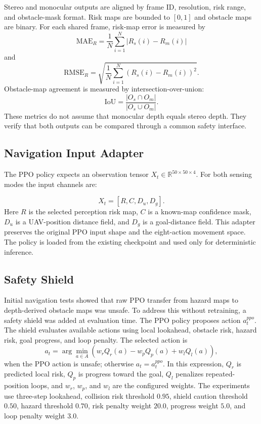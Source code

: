 \documentclass[12pt]{article}
\begin{document}
\noindent
Stereo and monocular outputs are aligned by frame ID, resolution, risk range, and obstacle-mask format. Risk maps are bounded to $[0,1]$ and obstacle maps are binary. For each shared frame, risk-map error is measured by
\begin{equation}
\text{MAE}_{R}=\frac{1}{N}\sum_{i=1}^{N}|R_s(i)-R_m(i)|
\end{equation}
and
\begin{equation}
\text{RMSE}_{R}=\sqrt{\frac{1}{N}\sum_{i=1}^{N}(R_s(i)-R_m(i))^2}.
\end{equation}
Obstacle-map agreement is measured by intersection-over-union:
\begin{equation}
\text{IoU}=\frac{|O_s \cap O_m|}{|O_s \cup O_m|}.
\end{equation}
These metrics do not assume that monocular depth equals stereo depth. They verify that both outputs can be compared through a common safety interface.

\subsection{Navigation Input Adapter}

\noindent
The PPO policy expects an observation tensor $X_t \in \mathbb{R}^{50 \times 50 \times 4}$. For both sensing modes the input channels are:

\begin{equation}
X_t=[R, C, D_u, D_g].
\end{equation}
Here $R$ is the selected perception risk map, $C$ is a known-map confidence mask, $D_u$ is a UAV-position distance field, and $D_g$ is a goal-distance field. This adapter preserves the original PPO input shape and the eight-action movement space. The policy is loaded from the existing checkpoint and used only for deterministic inference.

\subsection{Safety Shield}

\noindent
Initial navigation tests showed that raw PPO transfer from hazard maps to depth-derived obstacle maps was unsafe. To address this without retraining, a safety shield was added at evaluation time. The PPO policy proposes action $a_t^{ppo}$. The shield evaluates available actions using local lookahead, obstacle risk, hazard risk, goal progress, and loop penalty. The selected action is
\begin{equation}
a_t=\arg\min_{a\in A}\left(w_r Q_r(a)-w_p Q_p(a)+w_l Q_l(a)\right),
\end{equation}
when the PPO action is unsafe; otherwise $a_t=a_t^{ppo}$. In this expression, $Q_r$ is predicted local risk, $Q_p$ is progress toward the goal, $Q_l$ penalizes repeated-position loops, and $w_r$, $w_p$, and $w_l$ are the configured weights. The experiments use three-step lookahead, collision risk threshold $0.95$, shield caution threshold $0.50$, hazard threshold $0.70$, risk penalty weight $20.0$, progress weight $5.0$, and loop penalty weight $3.0$.
\end{document}
